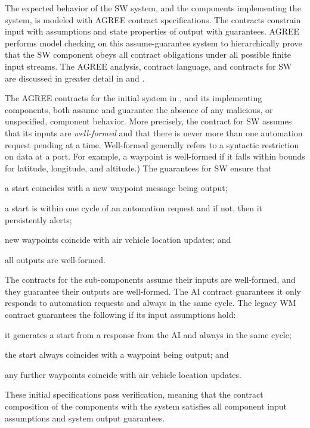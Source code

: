 
The expected behavior of the SW system, and the components
implementing the system, is modeled with AGREE contract
specifications.  The contracts constrain input with assumptions and
state properties of output with guarantees.  AGREE performs model
checking on this assume-guarantee system to hierarchically prove that
the SW component obeys all contract obligations under all possible
finite input streams.  The AGREE analysis, contract language, and
contracts for SW are discussed in greater detail in
 and .

The AGREE contracts for the initial system in ,
and its implementing components, both assume and guarantee the absence
of any malicious, or unspecified, component behavior.  More precisely,
the contract for SW assumes that its inputs are \emph{well-formed} and that
there is never more than one automation request pending at a time.
Well-formed generally refers to a syntactic restriction on
data at a port. For example, a waypoint is well-formed if it falls
within bounds for latitude, longitude, and altitude.)  The guarantees
for SW ensure that
\begin{compactitem}
\item a start coincides with a new waypoint message being output;
\item a start is within one cycle of an automation request and if not, then it persistently alerts;
\item new waypoints coincide with air vehicle location updates; and
\item all outputs are well-formed.
\end{compactitem}

The contracts for the sub-components assume their inputs are
well-formed, and they guarantee their outputs are well-formed.  The AI
contract guarantees it only responds to automation requests and always
in the same cycle.  The legacy WM contract guarantees the following if
its input assumptions hold:
\begin{compactitem}
  \item it generates a start from a response from the AI and always in the same cycle;
  \item the start always coincides with a waypoint being output; and
  \item any further waypoints coincide with air vehicle location updates.
\end{compactitem}
These initial specifications pass verification, meaning that the
contract composition of the components with the system satisfies all
component input assumptions and system output guarantees.

